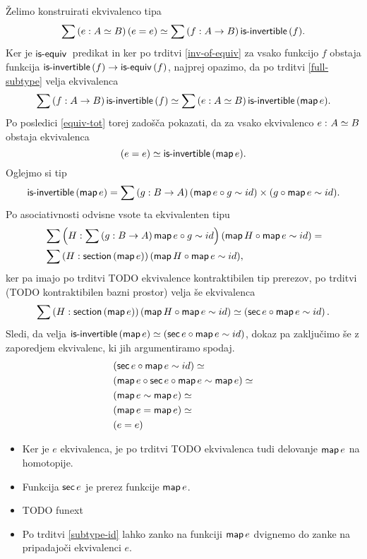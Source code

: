 \begin{dokaz}
  Želimo konstruirati ekvivalenco tipa
  \[\sumtype{e}{A \simeq B}{(e = e)} \simeq \sumtype{f}{A \to B}{\isinv(f)}.\]
  Ker je \(\isequiv\) predikat in ker po trditvi \ref{inv-of-equiv}
  za vsako funkcijo \(f\) obstaja funkcija
  \(\typename{is-invertible}(f) \to \typename{is-equiv}(f)\), najprej opazimo, da po
  trditvi \ref{full-subtype} velja ekvivalenca
  \[\sumtype{f}{A \to B}{\isinv(f)} \simeq
    \sumtype{e}{A \simeq B}{\isinv(\map e).}
  \]
  Po posledici \ref{equiv-tot}
  torej zadošča pokazati, da za vsako ekvivalenco \(\dequiv{e}{A}{B}\) obstaja ekvivalenca
  \[(e = e) \simeq \isinv(\map e).\]
  Oglejmo si tip \[\isinv(\map e) = \sumtype{g}{B \to A}{(\map e \circ g \sim id) \times (g \circ \map e \sim id)}.\]
  Po asociativnosti odvisne vsote ta ekvivalenten tipu
  \begin{align*}
    & \sumtype{H}{\sumtype{g}{B \to A}{\map e \circ g \sim id}}{(\map H \circ \map e \sim id)} = \\
    & \sumtype{H}{\typename{section}(\map e)}{(\map H \circ \map e \sim id)},
  \end{align*}
  ker pa imajo po trditvi TODO ekvivalence kontraktibilen tip prerezov, po trditvi
  (TODO kontraktibilen bazni prostor) velja še ekvivalenca
  \[\sumtype{H}{\typename{section}(\map e)}{(\map H \circ \map e \sim id)} \simeq
    \left(\typename{sec} e \circ \map e \sim id\right).\]
  Sledi, da velja \(\isinv(\map e) \simeq (\typename{sec} e \circ \map e \sim id)\), dokaz pa
  zaključimo še z zaporedjem ekvivalenc, ki jih argumentiramo spodaj.
  \begin{align*}
    & (\typename{sec} e \circ \map e \sim id) \simeq \\
    & (\map e \circ \typename{sec}e \circ \map e \sim \map e) \simeq \\
    & (\map e \sim \map e) \simeq \\
    & (\map e = \map e) \simeq \\
    & (e = e)
  \end{align*}
  \begin{itemize}
  \item Ker je \(e\) ekvivalenca, je po trditvi TODO ekvivalenca tudi delovanje \(\map e\)
    na homotopije.
  \item Funkcija \(\typename{sec}e\) je prerez funkcije \(\map e\).
  \item TODO funext
  \item Po trditvi \ref{subtype-id} lahko zanko na funkciji \(\map e\) dvignemo do
    zanke na pripadajoči ekvivalenci \(e\).
  \end{itemize}
\end{dokaz}


